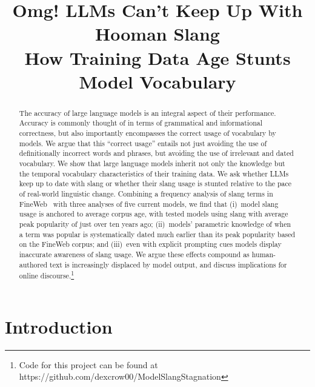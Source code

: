\documentclass[11pt]{article}
\title{Omg! LLMs Can't Keep Up With Hooman Slang \\
{\large How Training Data Age Stunts Model Vocabulary}}
\begin{document}
\maketitle

\begin{abstract}
The accuracy of large language models is an integral aspect of their performance. Accuracy is commonly thought of in terms of grammatical and informational correctness, but also importantly encompasses the correct usage of vocabulary by models. We argue that this ``correct usage'' entails not just avoiding the use of definitionally incorrect words and phrases, but avoiding the use of irrelevant and dated vocabulary. We show that large language models inherit not only the knowledge but the temporal vocabulary characteristics of their training data. We ask whether LLMs keep up to date with slang or whether their slang usage is stunted relative to the pace of real-world linguistic change. Combining a frequency analysis of slang terms in FineWeb~\cite{penedo2024the} with three analyses of five current models, we find that (i)~model slang usage is anchored to average corpus age, with tested models using slang with average peak popularity of just over ten years ago; (ii)~models' parametric knowledge of when a term was popular is systematically dated much earlier than its peak popularity based on the FineWeb corpus; and (iii)~even with explicit prompting cues models display inaccurate awareness of slang usage. We argue these effects compound as human-authored text is increasingly displaced by model output, and discuss implications for online discourse.\footnote{Code for this project can be found at https://github.com/dexcrow00/ModelSlangStagnation}
\end{abstract}

\section{Introduction}
\end{document}
